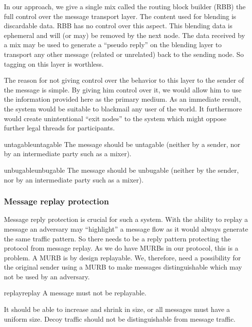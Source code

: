 In our approach, we give a single mix called the routing block builder (RBB) the full control over the message transport layer. The content used for blending is discardable data. RBB has no control over this aspect. This blending data is ephemeral and will (or may) be removed by the next node. The data received by a mix may be used to generate a ``pseudo reply'' on the blending layer to transport any other message (related or unrelated) back to the sending node. So tagging on this layer is worthless.

The reason for not giving control over the behavior to this layer to the sender of the message is simple. By giving him control over it, we would allow him to use the information provided here as the primary medium. As an immediate result, the system would be suitable to blackmail any user of the world. It furthermore would create unintentional ``exit nodes'' to the system which might oppose further legal threads for participants.

\begin{requirement}{untagable}{untagable}
	The message should be untagable (neither by a sender, nor by an intermediate party such as a mixer).
\end{requirement}

\begin{requirement}{unbugable}{unbugable}
    The message should be unbugable (neither by the sender, nor by an intermediate party such as a mixer).
\end{requirement}

\subsubsection{Message replay protection}
Message reply protection is crucial for such a system. With the ability to replay a message an adversary may ``highlight'' a message flow as it would always generate the same traffic pattern. So there needs to be a reply pattern protecting the protocol from message replay. As we do have MURBs in our protocol, this is a problem. A MURB is by design replayable. We, therefore, need a possibility for the original sender using a MURB to make messages distinguishable which may not be used by an adversary.

\begin{requirement}{replay}{replay}
    A message must not be replayable.
\end{requirement}

It should be able to increase and shrink in size, or all messages must have a uniform size. Decoy traffic should not be distinguishable from message traffic. 

